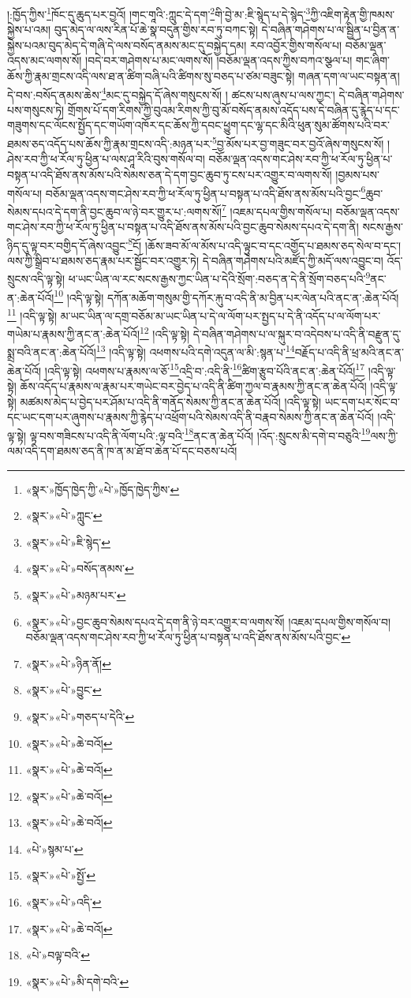 །:ཁྱོད་ཀྱིས་\footnote{«སྣར་»ཁྱོད་ཁྱེད་ཀྱི་«པེ་»ཁྱོད་ཁྱེད་ཀྱིས་}ཁོང་དུ་ཆུད་པར་བྱའོ། །གང་གཱའི་:ཀླུང་དེ་དག་\footnote{«སྣར་»«པེ་»ཀླུང་}གི་བྱེ་མ་:ཇི་སྙེད་པ་དེ་སྙེད་\footnote{«སྣར་»«པེ་»ཇི་སྙེད་}ཀྱི་འཇིག་རྟེན་གྱི་ཁམས་སྐྱེས་པ་འམ། བུད་མེད་ལ་ལས་རིན་པོ་ཆེ་སྣ་བདུན་གྱིས་རབ་ཏུ་བཀང་སྟེ། དེ་བཞིན་གཤེགས་པ་ལ་སྦྱིན་པ་བྱིན་ན་སྐྱེས་པའམ་བུད་མེད་དེ་གཞི་དེ་ལས་བསོད་ནམས་མང་དུ་བསྐྱེད་དམ། རབ་འབྱོར་གྱིས་གསོལ་པ། བཅོམ་ལྡན་འདས་མང་ལགས་སོ། །བདེ་བར་གཤེགས་པ་མང་ལགས་སོ། །བཅོམ་ལྡན་འདས་ཀྱིས་བཀའ་སྩལ་པ། གང་ཞིག་ཆོས་ཀྱི་རྣམ་གྲངས་འདི་ལས་ཐ་ན་ཚིག་བཞི་པའི་ཚིགས་སུ་བཅད་པ་ཙམ་བཟུང་སྟེ། གཞན་དག་ལ་ཡང་བསྟན་ན། དེ་བས་:བསོད་ནམས་ཆེས་\footnote{«སྣར་»«པེ་»བསོད་ནམས་}མང་དུ་བསྐྱེད་དོ་ཞེས་གསུངས་སོ། །
ཚངས་པས་ཞུས་པ་ལས་ཀྱང་། དེ་བཞིན་གཤེགས་པས་གསུངས་ཏེ། གྲོགས་པོ་དག་རིགས་ཀྱི་བུའམ་རིགས་ཀྱི་བུ་མོ་བསོད་ནམས་འདོད་པས་དེ་བཞིན་དུ་རྙེད་པ་དང་གཟུགས་དང་ལོངས་སྤྱོད་དང་གཡོག་འཁོར་དང་ཆོས་ཀྱི་དབང་ཕྱུག་དང་ལྷ་དང་མིའི་ཕུན་སུམ་ཚོགས་པའི་བར་ཐམས་ཅད་འདོད་པས་ཆོས་ཀྱི་རྣམ་གྲངས་འདི་:མཉན་པར་\footnote{«སྣར་»«པེ་»མཉམ་པར་}བྱ་མོས་པར་བྱ་གཟུང་བར་བྱའོ་ཞེས་གསུངས་སོ། །ཤེས་རབ་ཀྱི་ཕ་རོལ་ཏུ་ཕྱིན་པ་ལས་ཤཱ་རིའི་བུས་གསོལ་བ། བཅོམ་ལྡན་འདས་གང་ཤེས་རབ་ཀྱི་ཕ་རོལ་ཏུ་ཕྱིན་པ་བསྟན་པ་འདི་ཐོས་ནས་མོས་པའི་སེམས་ཅན་དེ་དག་བྱང་ཆུབ་ཏུ་ངས་པར་འགྱུར་བ་ལགས་སོ། །བྱམས་པས་གསོལ་པ། བཅོམ་ལྡན་འདས་གང་ཤེས་རབ་ཀྱི་ཕ་རོལ་ཏུ་ཕྱིན་པ་བསྟན་པ་འདི་ཐོས་ནས་མོས་པའི་བྱང་\footnote{«སྣར་»«པེ་»བྱང་ཆུབ་སེམས་དཔའ་དེ་དག་ནི་ཉེ་བར་འགྱུར་བ་ལགས་སོ། །འཇམ་དཔལ་གྱིས་གསོལ་བ། བཅོམ་ལྡན་འདས་གང་ཤེས་རབ་ཀྱི་ཕ་རོལ་ཏུ་ཕྱིན་པ་བསྟན་པ་འདི་ཐོས་ནས་མོས་པའི་བྱང་}ཆུབ་སེམས་དཔའ་དེ་དག་ནི་བྱང་ཆུབ་ལ་ཉེ་བར་གྱུར་པ་:ལགས་སོ།\footnote{«སྣར་»«པེ་»ཉིན་ནོ།} །འཇམ་དཔལ་གྱིས་གསོལ་པ། བཅོམ་ལྡན་འདས་གང་ཤེས་རབ་ཀྱི་ཕ་རོལ་ཏུ་ཕྱིན་པ་བསྟན་པ་འདི་ཐོས་ནས་མོས་པའི་བྱང་ཆུབ་སེམས་དཔའ་དེ་དག་ནི། སངས་རྒྱས་ཉིད་དུ་ལྟ་བར་བགྱིད་དོ་ཞེས་འབྱུང་\footnote{«སྣར་»«པེ་»བྱུང་}ངོ། །ཆོས་ཟབ་མོ་ལ་མོས་པ་འདི་ལྟུང་བ་དང་འགྱོད་པ་ཐམས་ཅད་སེལ་བ་དང་། ལས་ཀྱི་སྒྲིབ་པ་ཐམས་ཅད་རྣམ་པར་སྦྱོང་བར་འགྱུར་ཏེ། དེ་བཞིན་གཤེགས་པའི་མཛོད་ཀྱི་མདོ་ལས་འབྱུང་བ། འོད་སྲུངས་འདི་ལྟ་སྟེ། ཕ་ཡང་ཡིན་ལ་རང་སངས་རྒྱས་ཀྱང་ཡིན་པ་དེའི་སྲོག་:བཅད་ན་དེ་ནི་སྲོག་བཅད་པའི་\footnote{«སྣར་»«པེ་»གཅད་པ་དེའི་}ནང་ན་:ཆེན་པོའོ།\footnote{«སྣར་»«པེ་»ཆེ་བའོ།} །འདི་ལྟ་སྟེ། དཀོན་མཆོག་གསུམ་གྱི་དཀོར་རྐུ་བ་འདི་ནི་མ་བྱིན་པར་ལེན་པའི་ནང་ན་:ཆེན་པོའོ།\footnote{«སྣར་»«པེ་»ཆེ་བའོ།} །འདི་ལྟ་སྟེ། མ་ཡང་ཡིན་ལ་དགྲ་བཅོམ་མ་ཡང་ཡིན་པ་དེ་ལ་ལོག་པར་སྤྱད་པ་དེ་ནི་འདོད་པ་ལ་ལོག་པར་གཡེམ་པ་རྣམས་ཀྱི་ནང་ན་:ཆེན་པོའོ།\footnote{«སྣར་»«པེ་»ཆེ་བའོ།} །འདི་ལྟ་སྟེ། དེ་བཞིན་གཤེགས་པ་ལ་སྐུར་བ་འདེབས་པ་འདི་ནི་བརྫུན་དུ་སྨྲ་བའི་ནང་ན་:ཆེན་པོའོ།\footnote{«སྣར་»«པེ་»ཆེ་བའོ།} །འདི་ལྟ་སྟེ། འཕགས་པའི་དགེ་འདུན་ལ་མི་:སྙན་པ་\footnote{«པེ་»སྙམ་པ་}བརྗོད་པ་འདི་ནི་ཕྲ་མའི་ནང་ན་ཆེན་པོའོ། །འདི་ལྟ་སྟེ། འཕགས་པ་རྣམས་ལ་ཅོ་\footnote{«སྣར་»«པེ་»སྤྱོ་}འདྲི་བ་:འདི་ནི་\footnote{«སྣར་»«པེ་»འདི་}ཚིག་རྩུབ་པོའི་ནང་ན་:ཆེན་པོའོ།\footnote{«སྣར་»«པེ་»ཆེ་བའོ།} །འདི་ལྟ་སྟེ། ཆོས་འདོད་པ་རྣམས་ལ་རྣམ་པར་གཡེང་བར་བྱེད་པ་འདི་ནི་ཚིག་ཀྱལ་བ་རྣམས་ཀྱི་ནང་ན་ཆེན་པོའོ། །འདི་ལྟ་སྟེ། མཚམས་མེད་པ་བྱེད་པར་ཤོམ་པ་འདི་ནི་གནོད་སེམས་ཀྱི་ནང་ན་ཆེན་པོའོ། །འདི་ལྟ་སྟེ། ཡང་དག་པར་སོང་བ་དང་ཡང་དག་པར་ཞུགས་པ་རྣམས་ཀྱི་རྙེད་པ་འཕྲོག་པའི་སེམས་འདི་ནི་བརྣབ་སེམས་ཀྱི་ནང་ན་ཆེན་པོའོ། །འདི་ལྟ་སྟེ། ལྟ་བས་གཟིངས་པ་འདི་ནི་ལོག་པའི་:ལྟ་བའི་\footnote{«པེ་»བལྟ་བའི་}ནང་ན་ཆེན་པོའོ། །འོད་:སྲུངས་མི་དགེ་བ་བཅུའི་\footnote{«སྣར་»«པེ་»མི་དགེ་བའི་}ལས་ཀྱི་ལམ་འདི་དག་ཐམས་ཅད་ནི་ཁ་ན་མ་ཐོ་བ་ཆེན་པོ་དང་བཅས་པའོ། 